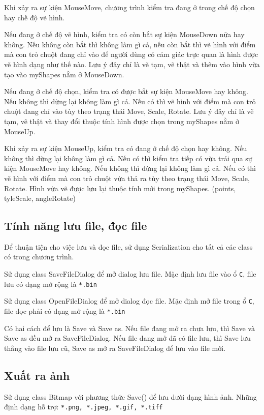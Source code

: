 \documentclass[12pt]{article}
\begin{document}
Khi xảy ra sự kiện MouseMove,
chương trình kiểm tra đang ở trong chế độ chọn hay chế độ vẽ hình.

Nếu đang ở chế độ vẽ hình, kiểm tra có còn bắt sự kiện MouseDown nữa hay không.
Nếu không còn bắt thì không làm gì cả,
nếu còn bắt thì vẽ hình với điểm mà con trỏ chuột đang chỉ vào
để người dùng có cảm giác trực quan là hình được vẽ hình dạng như thế nào.
Lưu ý đây chỉ là vẽ tạm, vẽ thật và thêm vào hình vừa tạo vào myShapes nằm ở MouseDown.

Nếu đang ở chế độ chọn, kiểm tra có được bắt sự kiện MouseMove hay không.
Nếu không thì dừng lại không làm gì cả.
Nếu có thì vẽ hình với điểm mà con trỏ chuột đang chỉ vào tùy theo trạng thái Move, Scale, Rotate.
Lưu ý đây chỉ là vẽ tạm, vẽ thật và thay đổi thuộc tính hình được chọn trong myShapes nằm ở MouseUp.

Khi xảy ra sự kiện MouseUp, kiểm tra có đang ở chế độ chọn hay không.
Nếu không thì dừng lại không làm gì cả.
Nếu có thì kiểm tra tiếp có vừa trải qua sự kiện MouseMove hay không.
Nếu không thì đừng lại không làm gì cả.
Nếu có thì vẽ hình với điểm mà con trỏ chuột vừa thả ra tùy theo trạng thái Move, Scale, Rotate.
Hình vừa vẽ được lưu lại thuộc tính mới trong myShapes. (points, tyleScale, angleRotate)

\subsection{Tính năng lưu file, đọc file}
Để thuận tiện cho việc lưu và đọc file, sử dụng Serialization cho tất cả các class có trong chương trình.

Sử dụng class SaveFileDialog để mở dialog lưu file.
Mặc định lưu file vào ổ \texttt{C}, file lưu có dạng mở rộng là \texttt{*.bin}

Sử dụng class OpenFileDialog để mở dialog đọc file.
Mặc định mở file trong ổ \texttt{C}, file đọc phải có dạng mở rộng là \texttt{*.bin}

Có hai cách để lưu là Save và Save as.
Nếu file đang mở ra chưa lưu, thì Save và Save as đều mở ra SaveFileDialog.
Nếu file đang mở đã có file lưu, thì Save lưu thẳng vào file lưu cũ,
Save as mở ra SaveFileDialog để lưu vào file mới.

\subsection{Xuất ra ảnh}
Sử dụng class Bitmap với phương thức Save() để lưu dưới dạng hình ảnh.
Những định dạng hỗ trợ: \texttt{*.png, *.jpeg, *.gif, *.tiff}
\end{document}
